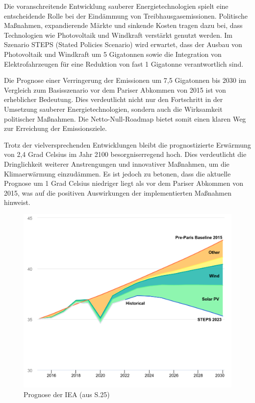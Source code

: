 \documentclass{article}
\begin{document}
Die voranschreitende Entwicklung sauberer Energietechnologien spielt eine entscheidende Rolle bei der Eindämmung von Treibhausgasemissionen. Politische Maßnahmen, expandierende Märkte und sinkende Kosten tragen dazu bei, dass Technologien wie Photovoltaik und Windkraft verstärkt genutzt werden. Im Szenario STEPS (Stated Policies Scenario) wird erwartet, dass der Ausbau von Photovoltaik und Windkraft um 5 Gigatonnen sowie die Integration von Elektrofahrzeugen für eine Reduktion von fast 1 Gigatonne verantwortlich sind.

Die Prognose einer Verringerung der Emissionen um 7,5 Gigatonnen bis 2030 im Vergleich zum Basisszenario vor dem Pariser Abkommen von 2015 ist von erheblicher Bedeutung. Dies verdeutlicht nicht nur den Fortschritt in der Umsetzung sauberer Energietechnologien, sondern auch die Wirksamkeit politischer Maßnahmen. Die Netto-Null-Roadmap bietet somit einen klaren Weg zur Erreichung der Emissionsziele.

Trotz der vielversprechenden Entwicklungen bleibt die prognostizierte Erwärmung von 2,4 Grad Celsius im Jahr 2100 besorgniserregend hoch. Dies verdeutlicht die Dringlichkeit weiterer Anstrengungen und innovativer Maßnahmen, um die Klimaerwärmung einzudämmen. Es ist jedoch zu betonen, dass die aktuelle Prognose um 1 Grad Celsius niedriger liegt als vor dem Pariser Abkommen von 2015, was auf die positiven Auswirkungen der implementierten Maßnahmen hinweist.

\begin{figure}
		\includegraphics[width=1.00\textwidth]{../Figures/global-energy-sector-CO2-emissions-in-the-pre-paris-baseline-and-stated-policies-scenarios-2015-2030.png}
	\caption{Prognose der IEA (aus \cite{iea_net_zero2023PDF} S.25)
	\label{fig:global-energy-sector-CO2-emissions}}
\end{figure}
\end{document}
